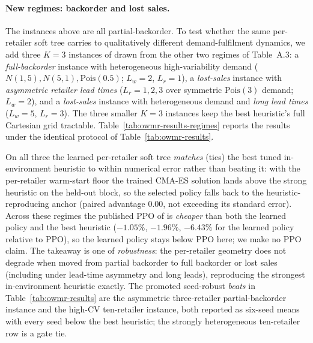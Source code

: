 \documentclass[11pt]{article}
\begin{document}
\paragraph{New regimes: backorder and lost sales.}
The instances above are all partial-backorder. To test whether the same per-retailer
soft tree carries to qualitatively different demand-fulfilment dynamics, we add three
$K{=}3$ instances of \citet{kaynov2024owmr} drawn from the other two regimes of
Table~A.3: a \emph{full-backorder} instance with heterogeneous high-variability demand
($N(1,5),N(5,1),\mathrm{Pois}(0.5)$; $L_w{=}2$, $L_r{=}1$), a \emph{lost-sales} instance
with \emph{asymmetric retailer lead times} ($L_r{=}1,2,3$ over symmetric $\mathrm{Pois}(3)$
demand; $L_w{=}2$), and a \emph{lost-sales} instance with heterogeneous demand and
\emph{long lead times} ($L_w{=}5$, $L_r{=}3$). The three smaller $K{=}3$ instances keep
the best heuristic's full Cartesian grid tractable. Table~\ref{tab:owmr-results-regimes} reports the
results under the identical protocol of Table~\ref{tab:owmr-results}.

On all three the learned per-retailer soft tree \emph{matches} (ties) the best tuned in-environment
heuristic to within numerical error rather than beating it: with the per-retailer warm-start
floor the trained CMA-ES solution lands above the strong heuristic on the held-out block, so
the selected policy falls back to the heuristic-reproducing anchor (paired advantage $0.00$, not
exceeding its standard error). Across these regimes the published PPO of
\citet{kaynov2024owmr} is \emph{cheaper} than both the learned policy and the best heuristic
($-1.05\%$, $-1.96\%$, $-6.43\%$ for the learned policy relative to PPO), so the learned
policy stays below PPO here; we make no PPO claim. The takeaway is one of \emph{robustness}:
the per-retailer geometry does not degrade when moved from partial backorder to full
backorder or lost sales (including under lead-time asymmetry and long leads), reproducing the
strongest in-environment heuristic exactly. The promoted seed-robust \emph{beats} in
Table~\ref{tab:owmr-results} are the asymmetric three-retailer partial-backorder instance and the
high-CV ten-retailer instance, both reported as six-seed means with every seed below the best
heuristic; the strongly heterogeneous ten-retailer row is a gate tie.
\end{document}
